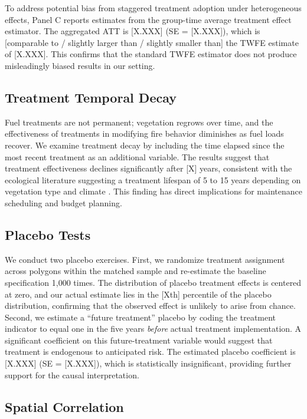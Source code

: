 \documentclass[12pt, letterpaper]{article}
\begin{document}
To address potential bias from staggered treatment adoption under heterogeneous effects, Panel C reports estimates from the \citet{callaway2021} group-time average treatment effect estimator. The aggregated ATT is [X.XXX] (SE = [X.XXX]), which is [comparable to / slightly larger than / slightly smaller than] the TWFE estimate of [X.XXX]. This confirms that the standard TWFE estimator does not produce misleadingly biased results in our setting.

\subsection{Treatment Temporal Decay}

Fuel treatments are not permanent; vegetation regrows over time, and the effectiveness of treatments in modifying fire behavior diminishes as fuel loads recover. We examine treatment decay by including the time elapsed since the most recent treatment as an additional variable. The results suggest that treatment effectiveness declines significantly after [X] years, consistent with the ecological literature suggesting a treatment lifespan of 5 to 15 years depending on vegetation type and climate \citep{agee2005}. This finding has direct implications for maintenance scheduling and budget planning.

\subsection{Placebo Tests}

We conduct two placebo exercises. First, we randomize treatment assignment across polygons within the matched sample and re-estimate the baseline specification 1,000 times. The distribution of placebo treatment effects is centered at zero, and our actual estimate lies in the [Xth] percentile of the placebo distribution, confirming that the observed effect is unlikely to arise from chance. Second, we estimate a ``future treatment'' placebo by coding the treatment indicator to equal one in the five years \textit{before} actual treatment implementation. A significant coefficient on this future-treatment variable would suggest that treatment is endogenous to anticipated risk. The estimated placebo coefficient is [X.XXX] (SE = [X.XXX]), which is statistically insignificant, providing further support for the causal interpretation.

\subsection{Spatial Correlation}
\end{document}
